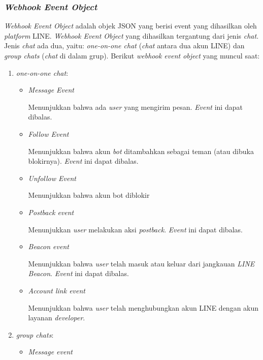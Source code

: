 \subsubsection{\textit{Webhook Event Object}}
\textit{Webhook Event Object} adalah objek JSON yang berisi event yang dihasilkan oleh \textit{platform} LINE. \textit{Webhook Event Object} yang dihasilkan tergantung dari jenis \textit{chat}. Jenis \textit{chat} ada dua, yaitu: \textit{one-on-one chat} (\textit{chat} antara dua akun LINE) dan \textit{group chats} (\textit{chat} di dalam grup). Berikut \textit{webhook event object} yang muncul saat:
\begin{enumerate}
\item \textit{one-on-one chat}:

\begin{itemize}
\item \textit{Message Event}

Menunjukkan bahwa ada \textit{user} yang mengirim pesan. \textit{Event} ini dapat dibalas.

\item \textit{Follow Event}

Menunjukkan bahwa akun \textit{bot} ditambahkan sebagai teman (atau dibuka blokirnya). \textit{Event} ini dapat dibalas.

\item \textit{Unfollow Event}

Menunjukkan bahwa akun bot diblokir

\item \textit{Postback event}

Menunjukkan \textit{user} melakukan aksi \textit{postback}. \textit{Event} ini dapat dibalas.

\item \textit{Beacon event}

Menunjukkan bahwa \textit{user} telah masuk atau keluar dari jangkauan \textit{LINE Beacon}. \textit{Event} ini dapat dibalas.

\item \textit{Account link event }

Menunjukkan bahwa \textit{user} telah menghubungkan akun LINE dengan akun layanan \textit{developer}. 

\end{itemize}

\item \textit{group chats}:

\begin{itemize}
\item \textit{Message event}


\end{itemize}
\end{enumerate}
